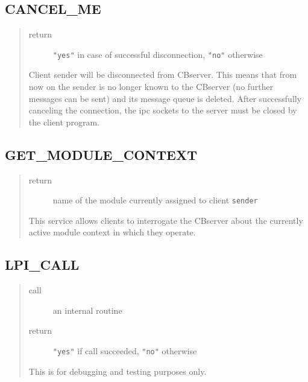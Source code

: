 \subsection{CANCEL\_ME}


\begin{quote}
\begin{description}
\item[return] \verb+"yes"+ in case of successful disconnection, \verb+"no"+ otherwise
\end{description}

Client sender will be disconnected from CBserver. This means
that from now on the sender is no longer known to the CBserver (no
further messages can be sent) and its message queue is deleted.
After successfully canceling the connection, the ipc sockets
to the server must be closed by the client program.
\end{quote}


\subsection{GET\_MODULE\_CONTEXT}


\begin{quote}
\begin{description}
\item[return] name of the module currently assigned to client {\tt sender}
\end{description}

This service allows clients to interrogate the CBserver about the currently active
module context in which they operate.
\end{quote}



\subsection{LPI\_CALL}


\begin{quote}
\begin{description}
\item[call] an internal routine
\item[return] \verb+"yes"+ if call succeeded, \verb+"no"+ otherwise
\end{description}

This is for debugging and testing purposes only.
\end{quote}

